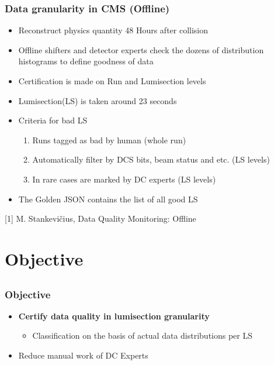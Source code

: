 \documentclass{beamer}
\begin{document}

\begin{frame}
\frametitle{Data granularity in CMS (Offline)}
\begin{itemize}
    \item Reconstruct physics quantity 48 Hours after collision 
    \item Offline shifters and detector experts check the dozens of distribution histograms to define goodness of data
    \item Certification is made on Run and Lumisection levels
    \item Lumisection(LS) is taken around 23 seconds
    \item Criteria for bad LS
    \begin{enumerate}
        \item Runs tagged as bad by human (whole run)
        \item Automatically filter by DCS bits, beam status and etc. (LS levels)
        \item In rare cases are marked by DC experts (LS levels)
    \end{enumerate}
    \item The Golden JSON contains the list of all good LS %
\end{itemize}
\vspace{0.4in}\tiny [1] M. Stankevičius, Data Quality Monitoring: Offline
\end{frame}

\section{Objective} %
\subsection{}

\begin{frame}
\frametitle{Objective}
\begin{itemize}
    \item \textbf{Certify data quality in lumisection granularity}
    \begin{itemize}
        \item Classification on the basis of actual data distributions per LS
    \end{itemize}
    \item Reduce manual work of DC Experts
\end{itemize}
\end{frame}
\end{document}
